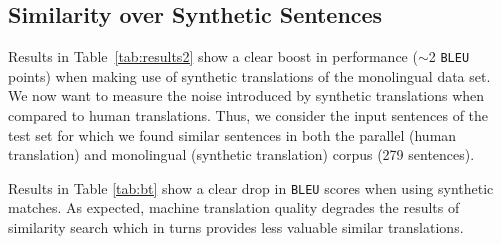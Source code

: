 \begin{table}[h!]
\begin{center}
\end{center}
  \caption{Differences of token average log probability between  and  model.}
  \label{tab:probabilities}
\end{table}

\subsection*{Similarity over Synthetic Sentences}

Results in Table~\ref{tab:results2} show a clear boost in performance ($\sim$2 \texttt{BLEU} points) when making use of synthetic translations of the  monolingual data set.
We now want to measure the noise introduced by synthetic translations when compared to human translations.
Thus, we consider the input sentences of the  test set for which we found similar sentences in both the parallel (human translation) and monolingual (synthetic translation) corpus (279 sentences).

Results in Table \ref{tab:bt} show a clear drop in \texttt{BLEU} scores when using synthetic matches.
As expected, machine translation quality degrades the results of similarity search which in turns provides less valuable similar translations.

\begin{table}[h!]
\begin{center}
\end{center}
  \caption{Results for a reduced test set (279 sentences) using  when priming with human and synthetic (back-translated) translations.}
  \label{tab:bt}
\end{table}

